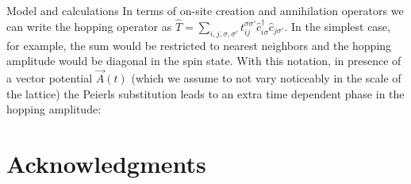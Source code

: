 \documentclass[aps,prl,twocolumn,amsmath,amssymb,superscriptaddress]{revtex4}%
\begin{document}
\begin{section}{Model and calculations}
In terms of on-site creation and annihilation operators we can write the hopping operator as $\hat{T} = \sum_{i,j, \sigma, \sigma'} t_{ij}^{\sigma \sigma'} \hat{c}_{i \sigma}^\dagger \hat{c}_{j \sigma'}$. In the simplest case, for example, the sum would be restricted to nearest neighbors and the hopping amplitude would be diagonal in the spin state. With this notation, in presence of a vector potential $\vec{A}(t)$ (which we assume to not vary noticeably in the scale of the lattice) the Peierls substitution leads to an extra time dependent phase in the hopping amplitude:
\end{section}

\section*{Acknowledgments}

\begin{thebibliography}{9}

\end{thebibliography}
\end{document}
